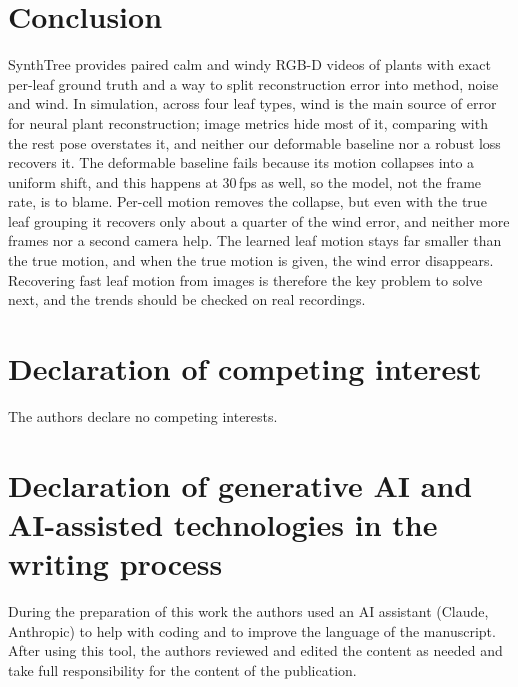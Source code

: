 \documentclass[preprint,11pt,authoryear]{elsarticle}
\begin{document}
\section{Conclusion}
SynthTree provides paired calm and windy RGB-D videos of plants with exact per-leaf ground truth and a way to split reconstruction error into method, noise and wind. In simulation, across four leaf types, wind is the main source of error for neural plant reconstruction; image metrics hide most of it, comparing with the rest pose overstates it, and neither our deformable baseline nor a robust loss recovers it. The deformable baseline fails because its motion collapses into a uniform shift, and this happens at 30\,fps as well, so the model, not the frame rate, is to blame. Per-cell motion removes the collapse, but even with the true leaf grouping it recovers only about a quarter of the wind error, and neither more frames nor a second camera help. The learned leaf motion stays far smaller than the true motion, and when the true motion is given, the wind error disappears. Recovering fast leaf motion from images is therefore the key problem to solve next, and the trends should be checked on real recordings.

\section*{Declaration of competing interest}
The authors declare no competing interests.

\section*{Declaration of generative AI and AI-assisted technologies in the writing process}
During the preparation of this work the authors used an AI assistant (Claude, Anthropic) to help with coding and to improve the language of the manuscript. After using this tool, the authors reviewed and edited the content as needed and take full responsibility for the content of the publication.



\end{document}
